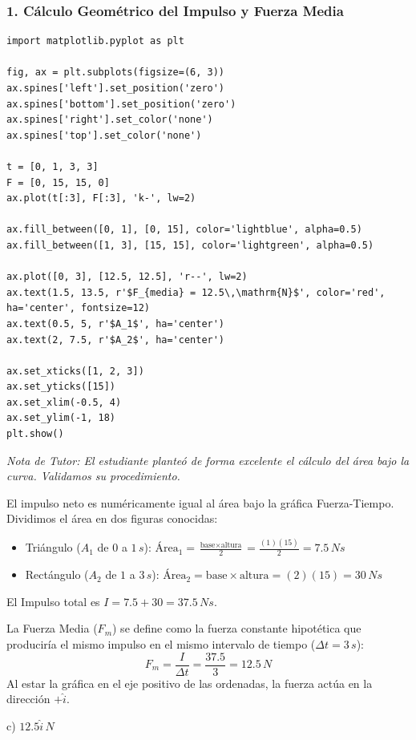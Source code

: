 \documentclass[12pt, a4paper]{article}
\begin{document}
\subsubsection*{1. Cálculo Geométrico del Impulso y Fuerza Media}

\begin{verbatim}
import matplotlib.pyplot as plt

fig, ax = plt.subplots(figsize=(6, 3))
ax.spines['left'].set_position('zero')
ax.spines['bottom'].set_position('zero')
ax.spines['right'].set_color('none')
ax.spines['top'].set_color('none')

t = [0, 1, 3, 3]
F = [0, 15, 15, 0]
ax.plot(t[:3], F[:3], 'k-', lw=2)

ax.fill_between([0, 1], [0, 15], color='lightblue', alpha=0.5)
ax.fill_between([1, 3], [15, 15], color='lightgreen', alpha=0.5)

ax.plot([0, 3], [12.5, 12.5], 'r--', lw=2)
ax.text(1.5, 13.5, r'$F_{media} = 12.5\,\mathrm{N}$', color='red', ha='center', fontsize=12)
ax.text(0.5, 5, r'$A_1$', ha='center')
ax.text(2, 7.5, r'$A_2$', ha='center')

ax.set_xticks([1, 2, 3])
ax.set_yticks([15])
ax.set_xlim(-0.5, 4)
ax.set_ylim(-1, 18)
plt.show()
\end{verbatim}

\textit{Nota de Tutor: El estudiante planteó de forma excelente el cálculo del área bajo la curva. Validamos su procedimiento.}

El impulso neto es numéricamente igual al área bajo la gráfica Fuerza-Tiempo. Dividimos el área en dos figuras conocidas:
\begin{itemize}
    \item Triángulo ($A_1$ de $0$ a $1\,\si{s}$): $\text{Área}_1 = \frac{\text{base} \times \text{altura}}{2} = \frac{(1)(15)}{2} = 7.5\,\si{Ns}$
    \item Rectángulo ($A_2$ de $1$ a $3\,\si{s}$): $\text{Área}_2 = \text{base} \times \text{altura} = (2)(15) = 30\,\si{Ns}$
\end{itemize}
El Impulso total es $I = 7.5 + 30 = 37.5\,\si{Ns}$.

La Fuerza Media ($F_m$) se define como la fuerza constante hipotética que produciría el mismo impulso en el mismo intervalo de tiempo ($\Delta t = 3\,\si{s}$):
$$ F_m = \frac{I}{\Delta t} = \frac{37.5}{3} = 12.5\,\si{N} $$
Al estar la gráfica en el eje positivo de las ordenadas, la fuerza actúa en la dirección $+\hat{i}$.

\begin{tcolorbox}[colback=green!5!white, colframe=green!50!black, title=Respuesta Final]
\centering \Large c) $12.5\hat{i}\,\si{N}$
\end{tcolorbox}
\end{document}
